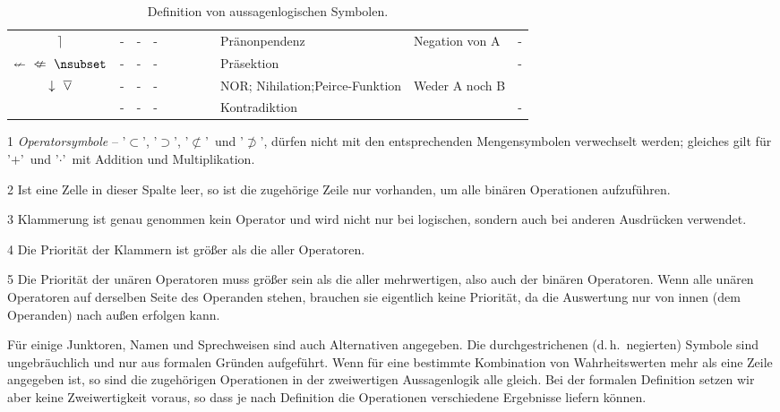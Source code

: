 \documentclass[english,ngerman,parskip=half,headsepline,footsepline]{scrreprt}
\makeatletter
\newcommand*{\textdh}{d.\@\,h.\@}
\newcommand*{\clq}{'}%
\newcommand*{\crq}{'}%
\newcommand*{\cse}{, }%
\newcommand*{\csp}{\crqt\cset\clqt}%
\newcommand*{\clqt}{}%
\newcommand*{\crqt}{}%
\newcommand*{\cset}{~}%
\newcommand*{\cspt}{\crqt\cset\clqt}%
\makeatother
\begin{document}
\begin{table}
\begin{threeparttable}
\begin{tabularx}{\linewidth-10.95pt}{c||c:cc:cccc|X:X|c|}
				\clqt$\rceil$\crqt &-&-&-&\textfalse&\textfalse&\texttrue&\texttrue& Pränonpendenz&Negation von A&-\\
				\tableline%
				\clqt$\nleftarrow$\cspt$\nLeftarrow$\cspt$\lnleftimpB$\crqt &-&-&-&\textfalse&\textfalse&\texttrue&\textfalse& Präsektion&&-\\
				\tableline%
				\clqt$\downarrow$\cspt$\operatorname{\overline\vee}$\crqt &-&-&-&\textfalse&\textfalse&\textfalse&\texttrue& NOR; Nihilation;\newline Peirce-Funktion&Weder A noch B&\thepnor\\
				\tableline%
				~ &-&-&-&\textfalse&\textfalse&\textfalse&\textfalse& Kontradiktion&&-\\
				\hline%
			\end{tabularx}
			\begin{tablenotes}
				\footnotesize
				\item[1] \emph{Operatorsymbole} -- \clq$\subset$\crq, \clq$\supset$\crq, \clq$\nsubset$\crq\ und \clq$\nsupset$\crq, dürfen nicht mit den entsprechenden Mengensymbolen verwechselt werden; gleiches gilt für \clq$+$\crq\ und \clq$\cdot$\crq\ mit Addition und Multiplikation.
				\item[2] Ist eine Zelle in dieser Spalte leer, so ist die zugehörige Zeile nur vorhanden, um alle binären Operationen aufzuführen.
				\item[3] Klammerung ist genau genommen kein Operator und wird nicht nur bei logischen, sondern auch bei anderen Ausdrücken verwendet.
				\item[4] Die Priorität der Klammern ist größer als die aller Operatoren.
				\item[5] Die Priorität der unären Operatoren muss größer sein als die aller mehrwertigen, also auch der binären Operatoren.
				Wenn alle unären Operatoren auf derselben Seite des Operanden stehen, brauchen sie eigentlich keine Priorität, da die Auswertung nur von innen (dem Operanden) nach außen erfolgen kann.
			\end{tablenotes}
			\caption{Definition von aussagenlogischen Symbolen.}
			\label{tab:Symbole}
		\end{threeparttable}
	\end{table}

	Für einige Junktoren, Namen und Sprechweisen sind auch Alternativen angegeben.
	Die durchgestrichenen (\textdh\ negierten) Symbole sind ungebräuchlich und nur aus formalen Gründen aufgeführt.
	Wenn für eine bestimmte Kombination von Wahrheitswerten mehr als eine Zeile angegeben ist, so sind die zugehörigen Operationen in der zweiwertigen Aussagenlogik alle gleich.
	Bei der formalen Definition setzen wir aber keine Zweiwertigkeit voraus, so dass je nach Definition die Operationen verschiedene Ergebnisse liefern können.
\end{document}
